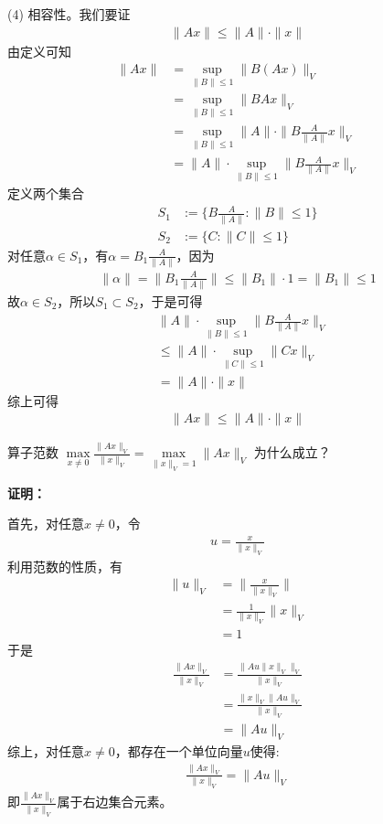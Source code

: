 \documentclass{article}
\begin{document}
(4) 相容性。我们要证
\begin{align*}
  \|Ax\| \leq \|A\| \cdot \|x\|
\end{align*}
由定义可知
\begin{align*}
  \|Ax\|
   & = \sup \limits_{\|B\| \leq 1} \|B (A x)\|_V                           \\
   & = \sup \limits_{\|B\| \leq 1} \|B A x\|_V                             \\
   & = \sup \limits_{\|B\| \leq 1} \|A\| \cdot \| B \frac{A}{\|A\|}  x\|_V \\
   & = \|A\| \cdot \sup \limits_{\|B\| \leq 1} \| B \frac{A}{\|A\|}  x\|_V
\end{align*}
定义两个集合
\begin{align*}
  S_1 & := \{ B \frac{A}{\|A\|} : \| B \| \leq 1 \} \\
  S_2 & := \{ C: \| C \| \leq 1\}
\end{align*}
对任意$\alpha \in S_1$，有$\alpha = B_1 \frac{A}{\|A\|}$，因为
\begin{align*}
  \|\alpha\| = \|B_1 \frac{A}{\|A\|}\| \leq \|B_1\| \cdot 1 = \|B_1\| \leq 1
\end{align*}
故$\alpha \in S_2$，所以$S_1 \subset S_2$，于是可得
\begin{align*}
   & \|A\| \cdot \sup \limits_{\|B\| \leq 1} \| B \frac{A}{\|A\|}  x\|_V      \\
   & \leq \|A\| \cdot \sup \limits_{\|C\| \leq 1} \| C x\|_V \\
   & = \|A\| \cdot \|x\|
\end{align*}
综上可得
\begin{align*}
  \|Ax\| \leq \|A\| \cdot \|x\|
\end{align*}


\begin{zremark}
  算子范数
  $\max\limits_{x \neq 0} \frac{\|Ax\|_V}{\|x\|_V} = \max\limits_{\|x\|_V = 1} \|A x\|_V$
  为什么成立？
\end{zremark}

\textbf{证明：}

首先，对任意$x \neq 0$，令
\begin{align*}
  u = \frac{x}{\|x\|_V}
\end{align*}
利用范数的性质，有
\begin{align*}
  \|u\|_V
   & = \|\frac{x}{\|x\|_V}\|     \\
   & = \frac{1}{\|x\|_V} \|x\|_V \\
   & = 1
\end{align*}
于是
\begin{align*}
  \frac{\|Ax\|_V}{\|x\|_V}
   & = \frac{\big\|A u \|x\|_V \big\|_V}{\|x\|_V} \\
   & = \frac{\|x\|_V \big\| A u\big\|_V}{\|x\|_V} \\
   & = \big\| A u\big\|_V
\end{align*}
综上，对任意$x \neq 0$，都存在一个单位向量$u$使得:
\begin{align*}
  \frac{\|Ax\|_V}{\|x\|_V} = \big\| A u\big\|_V
\end{align*}
即$\frac{\|Ax\|_V}{\|x\|_V}$属于右边集合元素。
\end{document}
